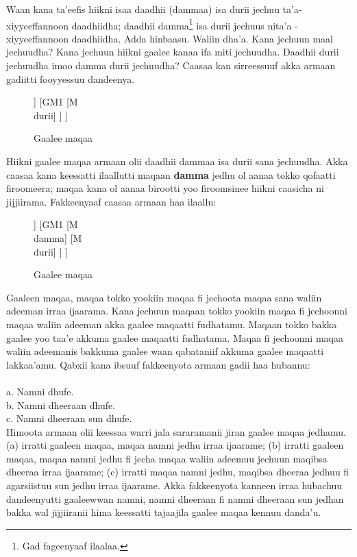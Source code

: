 \documentclass[11pt,b5paper]{book}
\begin{document}
Waan kana ta'eefis hiikni isaa daadhii (dammaa) isa durii jechuu ta'a-xiyyeeffannoon daadhiidha; daadhii damma\footnote{Gad fageenyaaf \cite{baye1986phrase} ilaalaa.} isa durii jechuus nita'a - xiyyeeffannoon daadhiidha. Adda hinbaasu. Waliin dha'a. Kana jechuun maal jechuudha? Kana jechuun hiikni gaalee kanaa ifa miti jechuudha. Daadhii durii jechuudha imoo damma durii jechuudha? Caasaa kan sirreessuuf akka armaan gadiitti fooyyessuu dandeenya. 

\begin{figure}[H]										
	\caption{Gaalee maqaa}
	\centering
	\begin{forest}
		[GMG
			[GM1
				[M\\daadhii]
				[M\\damma]
			]
			[GM1
				[M\\durii]
			]
		]
	\end{forest}
\end{figure}
Hiikni gaalee maqaa armaan olii daadhii dammaa isa durii sana jechuudha. Akka caasaa kana keessatti ilaallutti maqaan \textbf{damma} jedhu ol aanaa tokko qofaatti firoomeera; maqaa kana ol aanaa birootti yoo firoomsinee hiikni caasicha ni jijjiirama. Fakkeenyaaf caasaa armaan haa ilaallu:

\begin{figure}[H]										
	\caption{Gaalee maqaa}
	\centering
	\begin{forest}
		[GMG
			[GM1
				[M\\daadhii]
			]
			[GM1
				[M\\damma]
				[M\\durii]
			]
		]
	\end{forest}
\end{figure}

Gaaleen maqaa, maqaa tokko yookiin maqaa fi jechoota maqaa sana waliin adeeman irraa ijaarama. Kana jechuun maqaan
tokko yookiin maqaa fi jechoonni maqaa waliin adeeman akka gaalee maqaatti fudhatamu. Maqaan tokko bakka gaalee yoo
taa’e akkuma gaalee maqaatti fudhatama. Maqaa fi jechoonni maqaa waliin adeemanis bakkuma gaalee waan qabataniif
akkuma gaalee maqaatti lakkaa’amu. Qabxii kana ibsuuf fakkeenyota armaan gadii haa hubannu: \\
\\
a. Namni dhufe.\\
b. Namni dheeraan dhufe.\\
c. Namni dheeraan sun dhufe.\\

Himoota armaan olii keessaa warri jala sararamanii jiran gaalee maqaa jedhamu. (a) irratti gaaleen maqaa, maqaa
namni jedhu irraa ijaarame; (b) irratti gaaleen maqaa, maqaa namni jedhu fi jecha maqaa waliin adeemuu jechuun maqibsa dheeraa irraa ijaarame; (c) irratti maqaa namni jedhu, maqibsa dheeraa jedhuu fi agarsiistuu sun jedhu irraa ijaarame. Akka fakkeenyota kanneen irraa hubachuu dandeenyutti gaaleewwan namni, namni dheeraan fi namni
dheeraan sun jedhan bakka wal jijjiiranii hima keessatti tajaajila gaalee maqaa kennuu danda’u.
\end{document}
